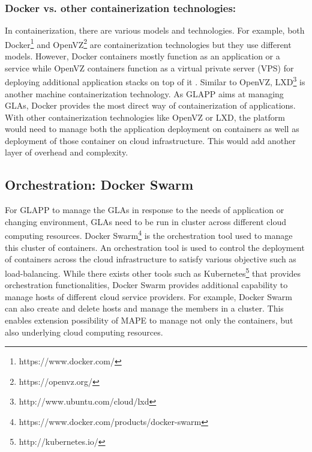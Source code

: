 \documentclass{seal_thesis}
\begin{document}
\subsubsection{Docker vs. other containerization technologies:}
In containerization, there are various models and technologies.
For example, both Docker\footnote{https://www.docker.com/} and OpenVZ\footnote{https://openvz.org/} are containerization technologies but they use different models.
However, Docker containers mostly function as an application or a service while OpenVZ containers function as a virtual private server (VPS) for deploying additional application stacks on top of it \cite{openvz}.
Similar to OpenVZ, LXD\footnote{http://www.ubuntu.com/cloud/lxd} is another machine containerization technology.
As GLAPP aims at managing GLAs, Docker provides the most direct way of containerization of applications.
With other containerization technologies like OpenVZ or LXD, the platform would need to manage both the application deployment on containers as well as deployment of those container on cloud infrastructure.
This would add another layer of overhead and complexity.


\subsection{Orchestration: Docker Swarm}
For GLAPP to manage the GLAs in response to the needs of application or changing environment, GLAs need to be run in cluster across different cloud computing resources.
Docker Swarm\footnote{https://www.docker.com/products/docker-swarm} is the orchestration tool used to manage this cluster of containers.
An orchestration tool is used to control the deployment of containers across the cloud infrastructure to satisfy various objective such as load-balancing.
While there exists other tools such as Kubernetes\footnote{http://kubernetes.io/} that provides orchestration functionalities, Docker Swarm provides additional capability to manage hosts of different cloud service providers.
For example, Docker Swarm can also create and delete hosts and manage the members in a cluster.
This enables extension possibility of MAPE to manage not only the containers, but also underlying cloud computing resources.
\end{document}
